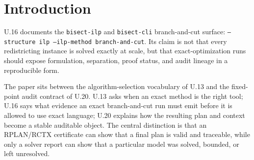 \section{Introduction}

U.16 documents the \texttt{bisect-ilp} and \texttt{bisect-cli}
branch-and-cut surface:
\texttt{--structure ilp --ilp-method branch-and-cut}. Its claim is not that
every redistricting instance is solved exactly at scale, but that
exact-optimization runs should expose formulation, separation, proof status,
and audit lineage in a reproducible form.

The paper sits between the algorithm-selection vocabulary of U.13 and the
fixed-point audit contract of U.20. U.13 asks when an exact method is the right
tool; U.16 says what evidence an exact branch-and-cut run must emit before it
is allowed to use exact language; U.20 explains how the resulting plan and
context become a stable auditable object. The central distinction is that an
RPLAN/RCTX certificate can show that a final plan is valid and traceable, while
only a solver report can show that a particular model was solved, bounded, or
left unresolved.
